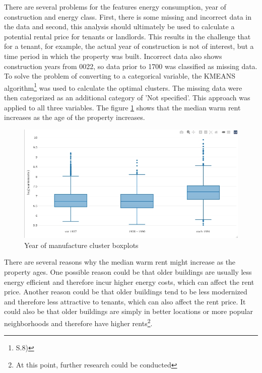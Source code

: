 There are several problems for the features energy consumption, year of construction and energy class. First, there is some missing and incorrect data in the data and second, this analysis should ultimately be used to calculate a potential rental price for tenants or landlords. This results in the challenge that for a tenant, for example, the actual year of construction is not of interest, but a time period in which the property was built. Incorrect data also shows construction years from 0022, so data prior to 1700 was classified as missing data. To solve the problem of converting to a categorical variable, the KMEANS algorithm\footnote{\cite{KMEANS} S.8)} was used to calculate the optimal clusters. The missing data were then categorized as an additional category of 'Not specified'. This approach was applied to all three variables.
The figure \ref{fig: Baujahr Warmmiete boxplots} shows that the median warm rent increases as the age of the property increases.
\begin{figure}[H]
	\centering
	\includegraphics[width=0.7\linewidth]{img/Baujahr Warmmiete boxplots}
	\caption{Year of manufacture cluster boxplots}
	\label{fig: Baujahr Warmmiete boxplots}
\end{figure}
There are several reasons why the median warm rent might increase as the property ages. One possible reason could be that older buildings are usually less energy efficient and therefore incur higher energy costs, which can affect the rent price. Another reason could be that older buildings tend to be less modernized and therefore less attractive to tenants, which can also affect the rent price. It could also be that older buildings are simply in better locations or more popular neighborhoods and therefore have higher rents\footnote{At this point, further research could be conducted}.

